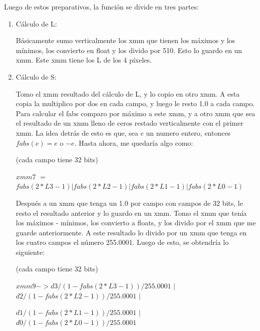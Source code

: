 \documentclass[a4paper]{article}
\begin{document}
\vspace*{0.3cm}


Luego de estos preparativos, la función se divide en tres partes:

\begin{enumerate}
	\item Cálculo de L:
	
	Básicamente sumo verticalmente los xmm que tienen los máximos y los mínimos, los convierto en float y los divido por 510. Esto lo guardo en un xmm. Este xmm tiene los L de los 4 píxeles.
	
	\item Cálculo de S:	
	
Tomo el xmm resultado del cálculo de L, y lo copio en otro xmm. A esta copia la multiplico por dos en cada campo, y luego le resto 1.0 a cada campo. Para calcular el fabs comparo por máximo a este xmm, y a otro xmm que sea el resultado de un xmm lleno de ceros restado verticalmente con el primer xmm. La idea detrás de esto es que, sea $e$ un numero entero, entonces $fabs(e) = e$ o $-e$. Hasta ahora, me quedaría algo como:

\vspace*{0.3cm}

(cada campo tiene 32 bits)

\vspace*{0.3cm}
	
$xmm7$ $=$ $fabs(2*L3 - 1) |fabs(2*L2 - 1)|fabs(2*L1 - 1)| fabs( 2*L0 - 1)$	
	
\vspace*{0.3cm}

Después a un xmm que tenga un 1.0 por campo con campos de 32 bits, le resto el resultado anterior y lo guardo en un xmm. Tomo el xmm que tenía los máximos - mínimos, los convierto a floats, y los divido por el xmm que me guarde anteriormente. A este resultado lo divido por un xmm que tenga en los cuatro campos el número 255.0001. Luego de esto, se obtendría lo siguiente:  

\vspace*{0.3cm}

(cada campo tiene 32 bits)

\vspace*{0.3cm}

$xmm9 -> d3 / (1 - fabs(2*L3 - 1)) / 255.0001$ $|$ $d2 / (1 - fabs(2*L2 - 1)) / 255.0001$ $|$

\hspace*{1.75cm}$d1 / (1 - fabs(2*L1 - 1)) / 255.0001$ $|$ $ d0/ (1 - fabs( 2*L0 - 1)) / 255.0001$


\end{enumerate}
\end{document}
